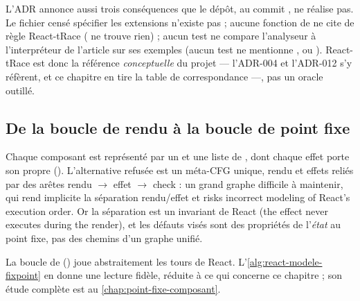 L'ADR annonce aussi trois conséquences que le dépôt, au commit ,
ne réalise pas. Le fichier  censé spécifier les
extensions n'existe pas ; aucune fonction de  ne cite de
règle React-tRace ( ne trouve rien) ; aucun test ne
compare l'analyseur à l'interpréteur de l'article sur ses exemples (aucun test
ne mentionne ,  ou ). React-tRace est
donc la référence \emph{conceptuelle} du projet --- l'ADR-004 et l'ADR-012 s'y
réfèrent, et ce chapitre en tire la table de correspondance ---, pas un oracle
outillé.

\subsection{De la boucle de rendu à la boucle de point fixe}

\begin{decision}
Chaque composant est représenté par un  et une liste de
, dont chaque effet porte son propre 
(). L'alternative refusée est un méta-CFG unique, rendu et effets
reliés par des arêtes rendu $\to$ effet $\to$ check : un grand graphe
difficile à maintenir, qui rend implicite la séparation rendu/effet et
\og risks incorrect modeling of React's execution order\fg{}. Or la séparation
est un invariant de React (\og the effect never executes during the
render\fg{}), et les défauts visés sont des propriétés de l'\emph{état} au
point fixe, pas des chemins d'un graphe unifié.
\end{decision}

La boucle de 
() joue abstraitement les tours de React.
L'\cref{alg:react-modele-fixpoint} en donne une lecture fidèle, réduite à ce
qui concerne ce chapitre ; son étude complète est au
\cref{chap:point-fixe-composant}.

